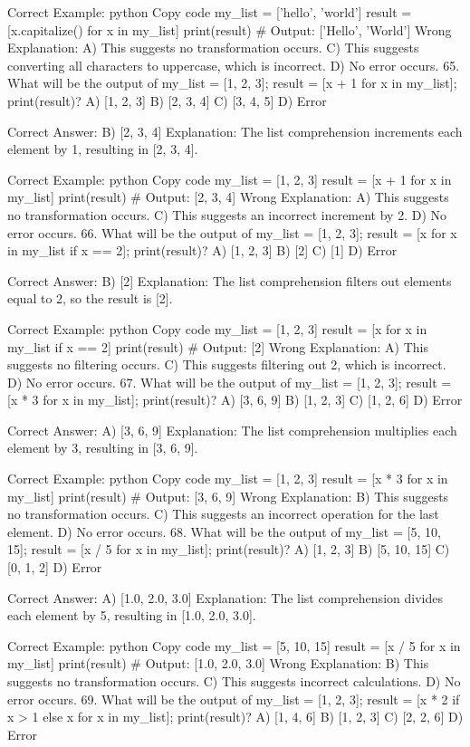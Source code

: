 Correct Example:
python
Copy code
my_list = ['hello', 'world']
result = [x.capitalize() for x in my_list]
print(result)  # Output: ['Hello', 'World']
Wrong Explanation:
A) This suggests no transformation occurs.
C) This suggests converting all characters to uppercase, which is incorrect.
D) No error occurs.
65. What will be the output of my_list = [1, 2, 3]; result = [x + 1 for x in my_list]; print(result)?
A) [1, 2, 3]
B) [2, 3, 4]
C) [3, 4, 5]
D) Error

Correct Answer: B) [2, 3, 4]
Explanation: The list comprehension increments each element by 1, resulting in [2, 3, 4].

Correct Example:
python
Copy code
my_list = [1, 2, 3]
result = [x + 1 for x in my_list]
print(result)  # Output: [2, 3, 4]
Wrong Explanation:
A) This suggests no transformation occurs.
C) This suggests an incorrect increment by 2.
D) No error occurs.
66. What will be the output of my_list = [1, 2, 3]; result = [x for x in my_list if x == 2]; print(result)?
A) [1, 2, 3]
B) [2]
C) [1]
D) Error

Correct Answer: B) [2]
Explanation: The list comprehension filters out elements equal to 2, so the result is [2].

Correct Example:
python
Copy code
my_list = [1, 2, 3]
result = [x for x in my_list if x == 2]
print(result)  # Output: [2]
Wrong Explanation:
A) This suggests no filtering occurs.
C) This suggests filtering out 2, which is incorrect.
D) No error occurs.
67. What will be the output of my_list = [1, 2, 3]; result = [x * 3 for x in my_list]; print(result)?
A) [3, 6, 9]
B) [1, 2, 3]
C) [1, 2, 6]
D) Error

Correct Answer: A) [3, 6, 9]
Explanation: The list comprehension multiplies each element by 3, resulting in [3, 6, 9].

Correct Example:
python
Copy code
my_list = [1, 2, 3]
result = [x * 3 for x in my_list]
print(result)  # Output: [3, 6, 9]
Wrong Explanation:
B) This suggests no transformation occurs.
C) This suggests an incorrect operation for the last element.
D) No error occurs.
68. What will be the output of my_list = [5, 10, 15]; result = [x / 5 for x in my_list]; print(result)?
A) [1, 2, 3]
B) [5, 10, 15]
C) [0, 1, 2]
D) Error

Correct Answer: A) [1.0, 2.0, 3.0]
Explanation: The list comprehension divides each element by 5, resulting in [1.0, 2.0, 3.0].

Correct Example:
python
Copy code
my_list = [5, 10, 15]
result = [x / 5 for x in my_list]
print(result)  # Output: [1.0, 2.0, 3.0]
Wrong Explanation:
B) This suggests no transformation occurs.
C) This suggests incorrect calculations.
D) No error occurs.
69. What will be the output of my_list = [1, 2, 3]; result = [x * 2 if x > 1 else x for x in my_list]; print(result)?
A) [1, 4, 6]
B) [1, 2, 3]
C) [2, 2, 6]
D) Error

